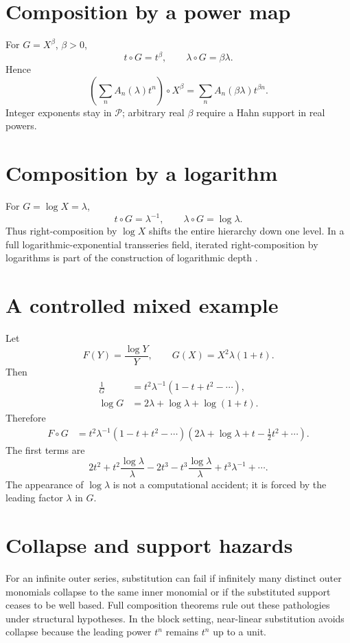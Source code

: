 \documentclass[11pt,openany]{book}
\theoremstyle{definition}
\theoremstyle{plain}
\theoremstyle{remark}
\newcommand{\Plog}{\mathscr{P}}
\begin{document}
\section{Composition by a power map}
For \(G=X^\beta\), \(\beta>0\),
\[
 t\circ G=t^\beta,
 \qquad
 \lambda\circ G=\beta\lambda.
\]
Hence
\begin{equation}\label{eq:power-composition}
 \left(\sum_nA_n(\lambda)t^n\right)\circ X^\beta
 =\sum_nA_n(\beta\lambda)t^{\beta n}.
\end{equation}
Integer exponents stay in \(\Plog\); arbitrary real \(\beta\) require a Hahn support in real powers.

\section{Composition by a logarithm}
For \(G=\log X=\lambda\),
\[
 t\circ G=\lambda^{-1},
 \qquad
 \lambda\circ G=\log\lambda.
\]
Thus right-composition by \(\log X\) shifts the entire hierarchy down one level. In a full logarithmic-exponential transseries field, iterated right-composition by logarithms is part of the construction of logarithmic depth \cite{edgar-beginners,vdhoeven-book}.

\section{A controlled mixed example}
Let
\[
 F(Y)=\frac{\log Y}{Y},
 \qquad
 G(X)=X^2\lambda(1+t).
\]
Then
\begin{align*}
 \frac1G&=t^2\lambda^{-1}(1-t+t^2-\cdots),\\
 \log G&=2\lambda+\log\lambda+\log(1+t).
\end{align*}
Therefore
\begin{align*}
 F\circ G
 &=t^2\lambda^{-1}(1-t+t^2-\cdots)
 \left(2\lambda+\log\lambda+t-\frac12t^2+\cdots\right).
\end{align*}
The first terms are
\[
 2t^2+t^2\frac{\log\lambda}{\lambda}
 -2t^3-t^3\frac{\log\lambda}{\lambda}
 +t^3\lambda^{-1}+\cdots.
\]
The appearance of \(\log\lambda\) is not a computational accident; it is forced by the leading factor \(\lambda\) in \(G\).

\section{Collapse and support hazards}
For an infinite outer series, substitution can fail if infinitely many distinct outer monomials collapse to the same inner monomial or if the substituted support ceases to be well based. Full composition theorems rule out these pathologies under structural hypotheses. In the block setting, near-linear substitution avoids collapse because the leading power \(t^n\) remains \(t^n\) up to a unit.
\end{document}
